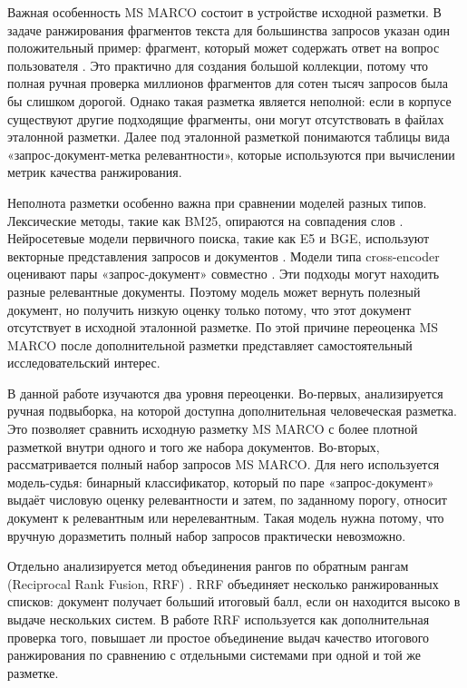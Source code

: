 \documentclass[runningheads,a4paper]{llncs}
\begin{document}
Важная особенность MS MARCO состоит в устройстве исходной разметки. В задаче ранжирования фрагментов текста для большинства запросов указан один положительный пример: фрагмент, который может содержать ответ на вопрос пользователя \cite{msmarco_datasets}. Это практично для создания большой коллекции, потому что полная ручная проверка миллионов фрагментов для сотен тысяч запросов была бы слишком дорогой. Однако такая разметка является неполной: если в корпусе существуют другие подходящие фрагменты, они могут отсутствовать в файлах эталонной разметки. Далее под эталонной разметкой понимаются таблицы вида «запрос-документ-метка релевантности», которые используются при вычислении метрик качества ранжирования.

Неполнота разметки особенно важна при сравнении моделей разных типов. Лексические методы, такие как BM25, опираются на совпадения слов \cite{robertson2009bm25}. Нейросетевые модели первичного поиска, такие как E5 и BGE, используют векторные представления запросов и документов \cite{wang2022e5,xiao2023cpack}. Модели типа cross-encoder оценивают пары «запрос-документ» совместно \cite{nogueira2019bert}. Эти подходы могут находить разные релевантные документы. Поэтому модель может вернуть полезный документ, но получить низкую оценку только потому, что этот документ отсутствует в исходной эталонной разметке. По этой причине переоценка MS MARCO после дополнительной разметки представляет самостоятельный исследовательский интерес.

В данной работе изучаются два уровня переоценки. Во-первых, анализируется ручная подвыборка, на которой доступна дополнительная человеческая разметка. Это позволяет сравнить исходную разметку MS MARCO с более плотной разметкой внутри одного и того же набора документов. Во-вторых, рассматривается полный набор запросов MS MARCO. Для него используется модель-судья: бинарный классификатор, который по паре «запрос-документ» выдаёт числовую оценку релевантности и затем, по заданному порогу, относит документ к релевантным или нерелевантным. Такая модель нужна потому, что вручную доразметить полный набор запросов практически невозможно.

Отдельно анализируется метод объединения рангов по обратным рангам (Reciprocal Rank Fusion, RRF) \cite{cormack2009rrf}. RRF объединяет несколько ранжированных списков: документ получает больший итоговый балл, если он находится высоко в выдаче нескольких систем. В работе RRF используется как дополнительная проверка того, повышает ли простое объединение выдач качество итогового ранжирования по сравнению с отдельными системами при одной и той же разметке.
\end{document}

